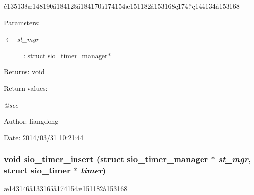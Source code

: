 \'{e}135138\ae{}148190\"{a}184128\"{a}184170\aa{}174154\ae{}151182\aa{}153168\c{c}174!`\c{c}144134\aa{}153168 

\begin{Desc}
\item[Parameters:]
\begin{description}
\item[\mbox{$\leftarrow$} {\em st\_\-mgr}]: struct sio\_\-timer\_\-manager$\ast$ \end{description}
\end{Desc}
\begin{Desc}
\item[Returns:]void \end{Desc}
\begin{Desc}
\item[Return values:]
\begin{description}
\item[{\em @see}]\end{description}
\end{Desc}
\begin{Desc}
\item[Author:]liangdong \end{Desc}
\begin{Desc}
\item[Date:]2014/03/31 10:21:44 \end{Desc}
\subsubsection{\setlength{\rightskip}{0pt plus 5cm}void sio\_\-timer\_\-insert (struct sio\_\-timer\_\-manager $\ast$ {\em st\_\-mgr}, struct sio\_\-timer $\ast$ {\em timer})}\label{sio__timer_8c_a8}


\ae{}143146\aa{}133165\aa{}174154\ae{}151182\aa{}153168 

